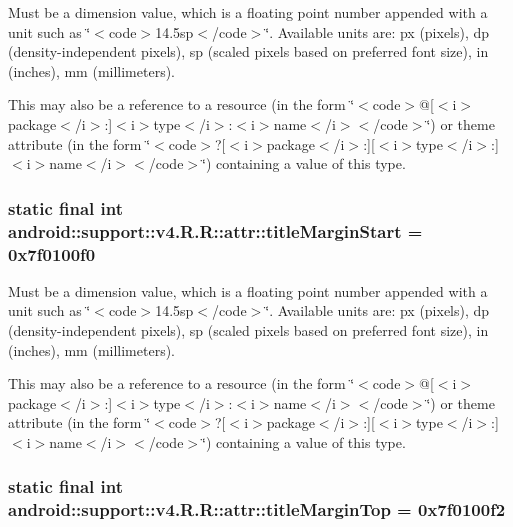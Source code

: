 Must be a dimension value, which is a floating point number appended with a unit such as \char`\"{}$<$code$>$14.5sp$<$/code$>$\char`\"{}. Available units are: px (pixels), dp (density-independent pixels), sp (scaled pixels based on preferred font size), in (inches), mm (millimeters). 

This may also be a reference to a resource (in the form \char`\"{}$<$code$>$@\mbox{[}$<$i$>$package$<$/i$>$:\mbox{]}$<$i$>$type$<$/i$>$:$<$i$>$name$<$/i$>$$<$/code$>$\char`\"{}) or theme attribute (in the form \char`\"{}$<$code$>$?\mbox{[}$<$i$>$package$<$/i$>$:\mbox{]}\mbox{[}$<$i$>$type$<$/i$>$:\mbox{]}$<$i$>$name$<$/i$>$$<$/code$>$\char`\"{}) containing a value of this type. \hypertarget{classandroid_1_1support_1_1v4_1_1_r_1_1attr_eea40cdc9dff4024fac377ecad1402c0}{
\subsubsection[{titleMarginStart}]{\setlength{\rightskip}{0pt plus 5cm}static final int android::support::v4.R.R::attr::titleMarginStart = 0x7f0100f0}}
\label{classandroid_1_1support_1_1v4_1_1_r_1_1attr_eea40cdc9dff4024fac377ecad1402c0}


Must be a dimension value, which is a floating point number appended with a unit such as \char`\"{}$<$code$>$14.5sp$<$/code$>$\char`\"{}. Available units are: px (pixels), dp (density-independent pixels), sp (scaled pixels based on preferred font size), in (inches), mm (millimeters). 

This may also be a reference to a resource (in the form \char`\"{}$<$code$>$@\mbox{[}$<$i$>$package$<$/i$>$:\mbox{]}$<$i$>$type$<$/i$>$:$<$i$>$name$<$/i$>$$<$/code$>$\char`\"{}) or theme attribute (in the form \char`\"{}$<$code$>$?\mbox{[}$<$i$>$package$<$/i$>$:\mbox{]}\mbox{[}$<$i$>$type$<$/i$>$:\mbox{]}$<$i$>$name$<$/i$>$$<$/code$>$\char`\"{}) containing a value of this type. \hypertarget{classandroid_1_1support_1_1v4_1_1_r_1_1attr_4b4e1164d08ee63f120528c1b28942b7}{
\subsubsection[{titleMarginTop}]{\setlength{\rightskip}{0pt plus 5cm}static final int android::support::v4.R.R::attr::titleMarginTop = 0x7f0100f2}}
\label{classandroid_1_1support_1_1v4_1_1_r_1_1attr_4b4e1164d08ee63f120528c1b28942b7}


